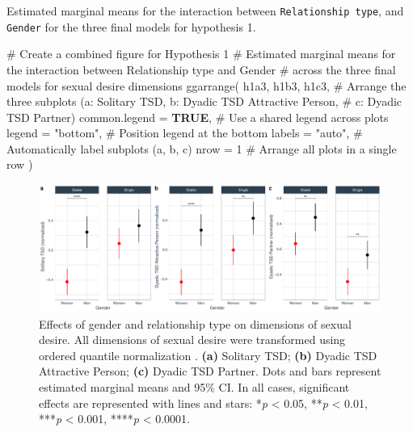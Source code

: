 \documentclass[
  bookmarksnumbered]{article}
\newenvironment{Shaded}{\begin{snugshade}}{\end{snugshade}}
\newcommand{\AttributeTok}[1]{\textcolor[rgb]{0.80,0.80,0.80}{#1}}
\newcommand{\CommentTok}[1]{\textcolor[rgb]{0.50,0.62,0.50}{#1}}
\newcommand{\ConstantTok}[1]{\textcolor[rgb]{0.86,0.64,0.64}{\textbf{#1}}}
\newcommand{\DecValTok}[1]{\textcolor[rgb]{0.86,0.86,0.80}{#1}}
\newcommand{\FunctionTok}[1]{\textcolor[rgb]{0.94,0.94,0.56}{#1}}
\newcommand{\NormalTok}[1]{\textcolor[rgb]{0.80,0.80,0.80}{#1}}
\newcommand{\StringTok}[1]{\textcolor[rgb]{0.80,0.58,0.58}{#1}}
\begin{document}
Estimated marginal means for the interaction between \texttt{Relationship\ type}, and \texttt{Gender} for the three final models for hypothesis 1.

\begin{Shaded}
\begin{Highlighting}[]
\CommentTok{\# Create a combined figure for Hypothesis 1}
\CommentTok{\# Estimated marginal means for the interaction between Relationship type and Gender}
\CommentTok{\# across the three final models for sexual desire dimensions}
\FunctionTok{ggarrange}\NormalTok{(}
\NormalTok{  h1a3, h1b3, h1c3, }\CommentTok{\# Arrange the three subplots (a: Solitary TSD, b: Dyadic TSD Attractive Person,}
  \CommentTok{\# c: Dyadic TSD Partner)}
  \AttributeTok{common.legend =} \ConstantTok{TRUE}\NormalTok{, }\CommentTok{\# Use a shared legend across plots}
  \AttributeTok{legend =} \StringTok{"bottom"}\NormalTok{, }\CommentTok{\# Position legend at the bottom}
  \AttributeTok{labels =} \StringTok{"auto"}\NormalTok{, }\CommentTok{\# Automatically label subplots (a, b, c)}
  \AttributeTok{nrow =} \DecValTok{1} \CommentTok{\# Arrange all plots in a single row}
\NormalTok{)}
\end{Highlighting}
\end{Shaded}

\begin{figure}
\centering
\includegraphics{Sexual_Desire_Arousal_files/figure-latex/fig-m1-fin-1.pdf}
\caption{\label{fig:fig-m1-fin}Effects of gender and relationship type on dimensions of sexual desire. All dimensions of sexual desire were transformed using ordered quantile normalization \autocite{petersonOrderedQuantileNormalization2020a}. \textbf{(a)} Solitary TSD; \textbf{(b)} Dyadic TSD Attractive Person; \textbf{(c)} Dyadic TSD Partner. Dots and bars represent estimated marginal means and 95\% CI. In all cases, significant effects are represented with lines and stars: *\emph{p} \textless{} 0.05, **\emph{p} \textless{} 0.01, ***\emph{p} \textless{} 0.001, ****\emph{p} \textless{} 0.0001.}
\end{figure}
\end{document}
